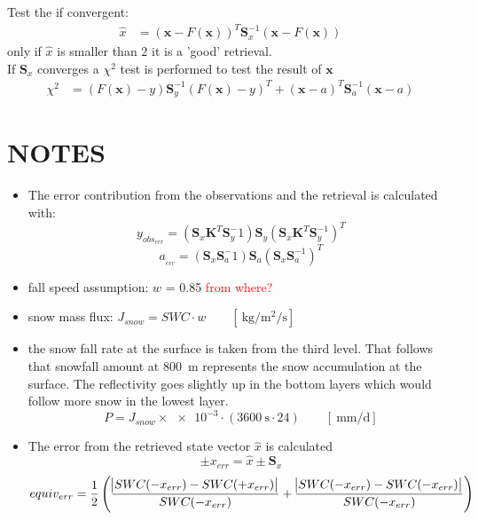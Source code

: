 Test the if convergent:
\begin{align}
	\hat{x} & = \left( \mathbf{x} - F(\mathbf{x}) \right)^T \mathbf{S}_x^{-1} \left(\mathbf{x} - F(\mathbf{x}) \right)
\end{align}
only if $\hat{x}$ is smaller than \num{2} it is a 'good' retrieval. 
\\
If $\mathbf{S}_x$ converges a $\chi^2$ test is performed to test the result of $\mathbf{x}$ 
\begin{align}
	\chi^2 & = \left( F(\mathbf{x}) - y  \right) \mathbf{S}_y^{-1} \left( F(\mathbf{x}) - y \right)^T + \left( \mathbf{x} - a \right)^T \mathbf{S}_a^{-1} \left( \mathbf{x} - a\right)
\end{align}


\section{NOTES}
\begin{itemize}
\item The error contribution from the observations and the retrieval is calculated with: 
	$$y_{obs_{err}} = \left( \mathbf{S}_x \mathbf{K}^T \mathbf{S}_y^-1 \right) \mathbf{S}_y \left( \mathbf{S}_x \mathbf{K}^T \mathbf{S}_y^{-1} \right)^T$$
    $$a_{_{err}} = \left( \mathbf{S}_x \mathbf{S}_a^-1 \right) \mathbf{S}_a \left( \mathbf{S}_x \mathbf{S}_a^{-1} \right)^T $$
\item fall speed assumption: $w$ = \SI{0.85}{\mPs} \textcolor{red}{from where?}
\item snow mass flux: $J_{snow} = SWC \cdot w \qquad [\SI{}{\kilogram\per\square\metre\per\second}]$ 
\item the snow fall rate at the surface is taken from the third level. That follows that snowfall amount at \SI{800}{\metre} represents the snow accumulation at the surface. The reflectivity goes slightly up in the bottom layers which would follow more snow in the lowest layer. 
	$$P = J_{snow} \times \num{e-3} \cdot \left(\SI{3600}{\second} \cdot24 \right) \qquad [\SI{}{\mm\per\day}]$$ 
\item The error from the retrieved state vector $\hat{x}$ is calculated
	$$\pm x_{err} = \hat{x} \pm \mathbf{S}_x$$ 
    $$equiv_{err} = \frac{1}{2} \left( \frac{\abs{SWC(-x_{err}) - SWC(+x_{err}) }}{SWC(-x_{err})} + \frac{\abs{SWC(-x_{err}) - SWC(-x_{err}) }}{SWC(-x_{err})} \right)$$
\end{itemize}


